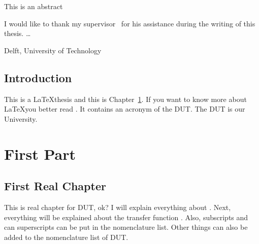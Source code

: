 \documentclass[a4paper,11pt]{mscThesis}
\begin{document}
%
\frontmatter %
%
    \maketitle
%

    This is an abstract
    \cleardoublepage
%

    I would like to thank my supervisor \mscreaderone\ for his assistance during the writing
    of this thesis. \ldots
    \vspace*{15mm}

    \noindent
    Delft, University of Technology \hfill \mscname\\
    \mscdate

%
    \tocloflot
%
    \printnomencl %
%
    \begin{acronym}[XXXXX]%
    \end{acronym}%
    \cleardoublepage%
%
    \printindex%
    \cleardoublepage%
%
%
\mainmatter
%
    \chapter{Introduction} \label{chap::intro}

    This is a \LaTeX thesis and this is Chapter\ \ref{chap::intro}.
    If you want to know more about \LaTeX you better read
    \cite{texbook}.  It contains an acronym
    of the \ac{DUT}. The \ac{DUT} is our University.

    \cleardoublepage
%
    \part{First Part}

    \chapter{First Real Chapter}

    This is real chapter for \ac{DUT}, ok? I will explain everything about . Next, everything
    will be explained about the transfer function . Also, subscripts and can
    superscripts can be put in the nomenclature  list.   Other things can also
    be added to the nomenclature list of \ac{DUT}.  
\end{document}
